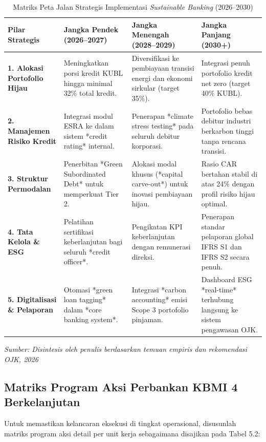 \documentclass[12pt,a4paper]{article}
\numberwithin{equation}{section}
\begin{document}
\begin{table}[H]
  \caption{Matriks Peta Jalan Strategis Implementasi \emph{Sustainable Banking} (2026--2030)}
  \label{tab:peta_jalan}
  \small
  \begin{tabularx}{\textwidth}{|>{\raggedright\arraybackslash}p{2.5cm}|>{\raggedright\arraybackslash}X|>{\raggedright\arraybackslash}X|>{\raggedright\arraybackslash}X|}
    \hline
    \textbf{Pilar Strategis} & \textbf{Jangka Pendek (2026--2027)} & \textbf{Jangka Menengah (2028--2029)} & \textbf{Jangka Panjang (2030+)} \\
    \hline
    \textbf{1. Alokasi Portofolio Hijau} & Meningkatkan porsi kredit KUBL hingga minimal 32\% total kredit. & Diversifikasi ke pembiayaan transisi energi dan ekonomi sirkular (target 35\%). & Integrasi penuh portofolio kredit net zero (target 40\% KUBL). \\
    \hline
    \textbf{2. Manajemen Risiko Kredit} & Integrasi modul ESRA ke dalam sistem *credit rating* internal. & Penerapan *climate stress testing* pada seluruh debitur korporasi. & Portofolio bebas debitur industri berkarbon tinggi tanpa rencana transisi. \\
    \hline
    \textbf{3. Struktur Permodalan} & Penerbitan *Green Subordinated Debt* untuk memperkuat Tier 2. & Alokasi modal khusus (*capital carve-out*) untuk inovasi pembiayaan hijau. & Rasio CAR bertahan stabil di atas 24\% dengan profil risiko hijau optimal. \\
    \hline
    \textbf{4. Tata Kelola \& ESG} & Pelatihan sertifikasi keberlanjutan bagi seluruh *credit officer*. & Pengikatan KPI keberlanjutan dengan remunerasi direksi. & Penerapan standar pelaporan global IFRS S1 dan IFRS S2 secara penuh. \\
    \hline
    \textbf{5. Digitalisasi \& Pelaporan} & Otomasi *green loan tagging* dalam *core banking system*. & Integrasi *carbon accounting* emisi Scope 3 portofolio pinjaman. & Dashboard ESG *real-time* terhubung langsung ke sistem pengawasan OJK. \\
    \hline
  \end{tabularx}
  \begin{flushleft}
    \textit{Sumber: Disintesis oleh penulis berdasarkan temuan empiris dan rekomendasi OJK, 2026}
  \end{flushleft}
\end{table}

\subsection{Matriks Program Aksi Perbankan KBMI 4 Berkelanjutan}
\noindent
Untuk memastikan kelancaran eksekusi di tingkat operasional, disusunlah matriks program aksi detail per unit kerja sebagaimana disajikan pada Tabel 5.2:
\end{document}
